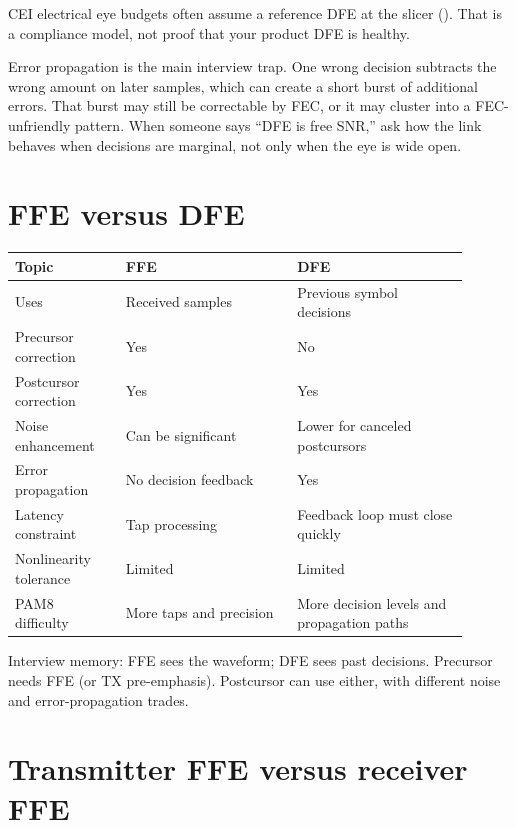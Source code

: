 CEI electrical eye budgets often assume a reference DFE at the slicer
(). That is a compliance model, not proof that your product
DFE is healthy.

Error propagation is the main interview trap. One wrong decision subtracts the
wrong amount on later samples, which can create a short burst of additional
errors. That burst may still be correctable by FEC, or it may cluster into a
FEC-unfriendly pattern. When someone says ``DFE is free SNR,'' ask how the link
behaves when decisions are marginal, not only when the eye is wide open.

\section{FFE versus DFE}
\label{sec:eq-ffe-vs-dfe}

\begin{center}
\footnotesize
\begin{tabular}{@{}p{0.22\linewidth}p{0.34\linewidth}p{0.34\linewidth}@{}}
\toprule
Topic & FFE & DFE \\
\midrule
Uses & Received samples & Previous symbol decisions \\
Precursor correction & Yes & No \\
Postcursor correction & Yes & Yes \\
Noise enhancement & Can be significant & Lower for canceled postcursors \\
Error propagation & No decision feedback & Yes \\
Latency constraint & Tap processing & Feedback loop must close quickly \\
Nonlinearity tolerance & Limited & Limited \\
PAM8 difficulty & More taps and precision & More decision levels and
propagation paths \\
\bottomrule
\end{tabular}
\end{center}

{\raggedright\footnotesize Interview memory: FFE sees the waveform; DFE sees
past decisions. Precursor needs FFE (or TX pre-emphasis). Postcursor can use
either, with different noise and error-propagation trades.\par}

\section{Transmitter FFE versus receiver FFE}
\label{sec:eq-tx-rx-ffe}

